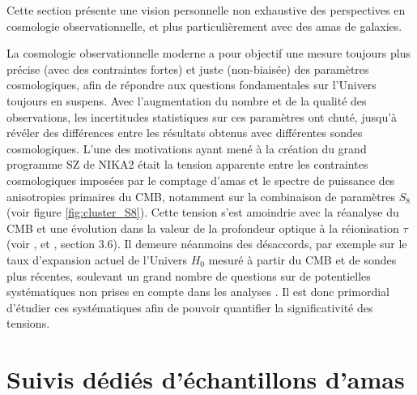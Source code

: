 Cette section présente une vision personnelle non exhaustive des perspectives en cosmologie observationnelle, et plus particulièrement avec des amas de galaxies.

La cosmologie observationnelle moderne a pour objectif une mesure toujours plus précise (avec des contraintes fortes) et juste (non-biaisée) des paramètres cosmologiques, afin de répondre aux questions fondamentales sur l'Univers toujours en suspens.
Avec l'augmentation du nombre et de la qualité des observations, les incertitudes statistiques sur ces paramètres ont chuté, jusqu'à révéler des différences entre les résultats obtenus avec différentes sondes cosmologiques.
L'une des motivations ayant mené à la création du grand programme SZ de NIKA2 était la tension apparente entre les contraintes cosmologiques imposées par le comptage d'amas et le spectre de puissance des anisotropies primaires du CMB, notamment sur la combinaison de paramètres $S_8$ (voir figure \ref{fig:cluster_S8}).
Cette tension s'est amoindrie avec la réanalyse du CMB et une évolution dans la valeur de la profondeur optique à la réionisation $\tau$ (voir \cite{salvati_constraints_2018}, et \cite{planck_collaboration_planck_2020}, section 3.6).
Il demeure néanmoins des désaccords, par exemple sur le taux d'expansion actuel de l'Univers $H_0$ mesuré à partir du CMB et de sondes plus récentes, soulevant un grand nombre de questions sur de potentielles systématiques non prises en compte dans les analyses \cite{efstathiou_h0_2021,freedman_measurements_2021}.
Il est donc primordial d'étudier ces systématiques afin de pouvoir quantifier la significativité des tensions.

\section*{Suivis dédiés d'échantillons d'amas}

